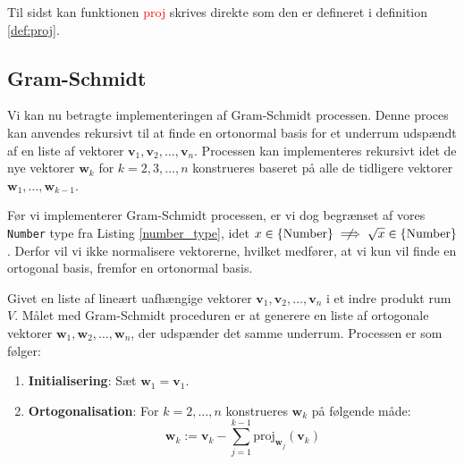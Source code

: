Til sidst kan funktionen \textcolor{red}{proj} skrives direkte som den er defineret i definition \ref{def:proj}.



\subsection{Gram-Schmidt}\label{sec:gram_schmidt}
Vi kan nu betragte implementeringen af Gram-Schmidt processen. Denne proces kan anvendes rekursivt til at finde en ortonormal basis for et underrum udspændt af en liste af vektorer $\mathbf{v}_1, \mathbf{v}_2, \ldots, \mathbf{v}_n$. Processen kan implementeres rekursivt idet de nye vektorer $\mathbf{w}_k$ for $k = 2, 3, \ldots, n$ konstrueres baseret på alle de tidligere vektorer $\mathbf{w}_1, \ldots, \mathbf{w}_{k-1}$.


Før vi implementerer Gram-Schmidt processen, er vi dog begrænset af vores \texttt{Number} type fra Listing \ref{number_type}, idet $x \in \text{\{Number\}} \centernot\implies \sqrt{x} \in \text{\{Number\}}$. Derfor vil vi ikke normalisere vektorerne, hvilket medfører, at vi kun vil finde en ortogonal basis, fremfor en ortonormal basis. 

\begin{definition}\label{def:gs}
Givet en liste af lineært uafhængige vektorer $\mathbf{v}_1, \mathbf{v}_2, \ldots, \mathbf{v}_n$ i et indre produkt rum $V$. Målet med Gram-Schmidt proceduren er at generere en liste af ortogonale vektorer $\mathbf{w}_1, \mathbf{w}_2, \ldots, \mathbf{w}_n$, der udspænder det samme underrum. Processen er som følger:

\vspace{0.5cm}
\begin{enumerate}
    \item \textbf{Initialisering}: Sæt $\mathbf{w}_1 = \mathbf{v}_1$.
    
    \item \textbf{Ortogonalisation}: For $k = 2, \ldots, n$ konstrueres $\mathbf{w}_k$ på følgende måde:
        \[
        \mathbf{w}_k := \mathbf{v}_k - \sum_{j=1}^{k-1} \text{proj}_{\mathbf{w}_j} (\mathbf{v}_k)
        \]
\end{enumerate}
\end{definition}





